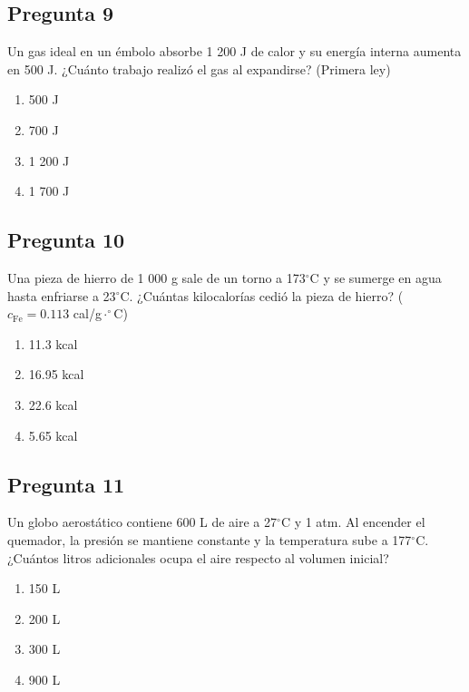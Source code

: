 \begin{preguntabox}
\subsection{Pregunta 9}
Un gas ideal en un émbolo absorbe 1 200 J de calor y su energía interna aumenta en 500 J. ¿Cuánto trabajo realizó el gas al expandirse? (Primera ley)

\begin{enumerate}
    \item[A)] 500 J
    \item[B)] 700 J
    \item[C)] 1 200 J
    \item[D)] 1 700 J
\end{enumerate}
\end{preguntabox}

\begin{preguntabox}
\subsection{Pregunta 10}
Una pieza de hierro de 1 000 g sale de un torno a 173$^\circ$C y se sumerge en agua hasta enfriarse a 23$^\circ$C. ¿Cuántas kilocalorías cedió la pieza de hierro? ($c_{\text{Fe}} = 0.113$ cal/g$\cdot^\circ$C)

\begin{enumerate}
    \item[A)] 11.3 kcal
    \item[B)] 16.95 kcal
    \item[C)] 22.6 kcal
    \item[D)] 5.65 kcal
\end{enumerate}
\end{preguntabox}


\begin{preguntabox}
\subsection{Pregunta 11}
Un globo aerostático contiene 600 L de aire a 27$^\circ$C y 1 atm. Al encender el quemador, la presión se mantiene constante y la temperatura sube a 177$^\circ$C. ¿Cuántos litros adicionales ocupa el aire respecto al volumen inicial?

\begin{enumerate}
    \item[A)] 150 L
    \item[B)] 200 L
    \item[C)] 300 L
    \item[D)] 900 L
\end{enumerate}
\end{preguntabox}

